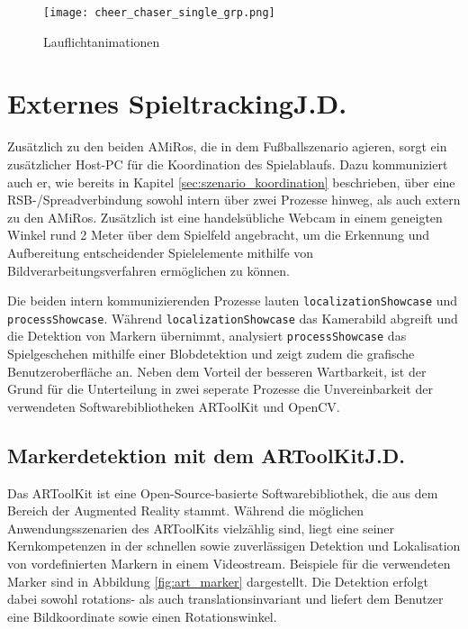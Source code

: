 \begin{figure}[H]
	\begin{center}
		\texttt{[image: cheer\_chaser\_single\_grp.png]} 	
		\caption{Lauflichtanimationen}
		\label{fig:cheer_chaser_single_grp}
	\end{center}
\end{figure}


\section[Externes Spieltracking]{Externes Spieltracking\hfill {\normalsize J.D.}} %

Zusätzlich zu den beiden AMiRos, die in dem Fußballszenario agieren, sorgt ein zusätzlicher Host-PC für die Koordination des Spielablaufs. Dazu kommuniziert auch er, wie bereits in Kapitel \ref{sec:szenario_koordination} beschrieben, über eine RSB-/Spreadverbindung sowohl intern über zwei Prozesse hinweg, als auch extern zu den AMiRos. Zusätzlich ist eine handelsübliche Webcam in einem geneigten Winkel rund 2 Meter über dem Spielfeld angebracht, um die Erkennung und Aufbereitung entscheidender Spielelemente mithilfe von Bildverarbeitungsverfahren ermöglichen zu können.

Die beiden intern kommunizierenden Prozesse lauten \texttt{localizationShowcase} und \texttt{processShowcase}. Während \texttt{localizationShowcase} das Kamerabild abgreift und die Detektion von Markern übernimmt, analysiert \texttt{processShowcase} das Spielgeschehen mithilfe einer Blobdetektion und zeigt zudem die grafische Benutzeroberfläche an. Neben dem Vorteil der besseren Wartbarkeit, ist der Grund für die Unterteilung in zwei seperate Prozesse die Unvereinbarkeit der verwendeten Softwarebibliotheken ARToolKit und OpenCV.

\subsection[Markerdetektion mit dem ARToolKit]{Markerdetektion mit dem ARToolKit\hfill {\normalsize J.D.}} %

Das ARToolKit ist eine Open-Source-basierte Softwarebibliothek, die aus dem Bereich der Augmented Reality stammt. Während die möglichen Anwendungsszenarien des ARToolKits vielzählig sind, liegt eine seiner Kernkompetenzen in der schnellen sowie zuverlässigen Detektion und Lokalisation von vordefinierten Markern in einem Videostream. Beispiele für die verwendeten Marker sind in Abbildung \ref{fig:art_marker} dargestellt. Die Detektion erfolgt dabei sowohl rotations- als auch translationsinvariant und liefert dem Benutzer eine Bildkoordinate sowie einen Rotationswinkel.

